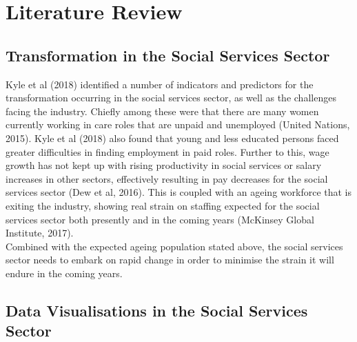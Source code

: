\documentclass[
  11pt,
]{article}
\begin{document}
\hypertarget{literature-review}{%
\section{Literature Review}\label{literature-review}}

\hypertarget{transformation-in-the-social-services-sector}{%
\subsection{Transformation in the Social Services Sector}\label{transformation-in-the-social-services-sector}}

Kyle et al (2018) identified a number of indicators and predictors for the transformation occurring in the social services sector, as well as the challenges facing the industry. Chiefly among these were that there are many women currently working in care roles that are unpaid and unemployed (United Nations, 2015). Kyle et al (2018) also found that young and less educated persons faced greater difficulties in finding employment in paid roles. Further to this, wage growth has not kept up with rising productivity in social services or salary increases in other sectors, effectively resulting in pay decreases for the social services sector (Dew et al, 2016). This is coupled with an ageing workforce that is exiting the industry, showing real strain on staffing expected for the social services sector both presently and in the coming years (McKinsey Global Institute, 2017).\\
Combined with the expected ageing population stated above, the social services sector needs to embark on rapid change in order to minimise the strain it will endure in the coming years.

\hypertarget{data-visualisations-in-the-social-services-sector}{%
\subsection{Data Visualisations in the Social Services Sector}\label{data-visualisations-in-the-social-services-sector}}
\end{document}
